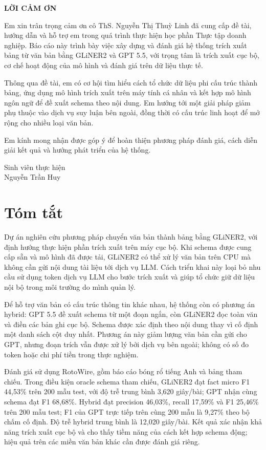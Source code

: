 \documentclass[12pt,a4paper]{article}
\begin{document}
\clearpage\thispagestyle{empty}
\begin{center}\Large\bfseries LỜI CẢM ƠN\end{center}
\vspace{.6cm}
Em xin trân trọng cảm ơn cô ThS. Nguyễn Thị Thuỳ Linh đã cung cấp đề tài, hướng dẫn và hỗ trợ em trong quá trình thực hiện học phần Thực tập doanh nghiệp. Báo cáo này trình bày việc xây dựng và đánh giá hệ thống trích xuất bảng từ văn bản bằng GLiNER2 và GPT 5.5, với trọng tâm là trích xuất cục bộ, cơ chế hoạt động của mô hình và đánh giá trên dữ liệu thực tế.

Thông qua đề tài, em có cơ hội tìm hiểu cách tổ chức dữ liệu phi cấu trúc thành bảng, ứng dụng mô hình trích xuất trên máy tính cá nhân và kết hợp mô hình ngôn ngữ để đề xuất schema theo nội dung. Em hướng tới một giải pháp giảm phụ thuộc vào dịch vụ suy luận bên ngoài, đồng thời có cấu trúc linh hoạt để mở rộng cho nhiều loại văn bản.

Em kính mong nhận được góp ý để hoàn thiện phương pháp đánh giá, cách diễn giải kết quả và hướng phát triển của hệ thống.
\begin{flushright}Sinh viên thực hiện\\Nguyễn Trần Huy\end{flushright}

\clearpage
{}
\section*{Tóm tắt}
Dự án nghiên cứu phương pháp chuyển văn bản thành bảng bằng GLiNER2, với định hướng thực hiện phần trích xuất trên máy cục bộ. Khi schema được cung cấp sẵn và mô hình đã được tải, GLiNER2 có thể xử lý văn bản trên CPU mà không cần gửi nội dung tài liệu tới dịch vụ LLM. Cách triển khai này loại bỏ nhu cầu sử dụng token dịch vụ LLM cho bước trích xuất và giúp tổ chức giữ dữ liệu nội bộ trong môi trường do mình quản lý.

Để hỗ trợ văn bản có cấu trúc thông tin khác nhau, hệ thống còn có phương án hybrid: GPT 5.5 đề xuất schema từ một đoạn ngắn, còn GLiNER2 đọc toàn văn và điền các bản ghi cục bộ. Schema được xác định theo nội dung thay vì cố định một danh sách cột duy nhất. Phương án này giảm lượng văn bản cần gửi cho GPT, nhưng đoạn trích vẫn được xử lý bởi dịch vụ bên ngoài; không có số đo token hoặc chi phí tiền trong thực nghiệm.

Đánh giá sử dụng RotoWire, gồm báo cáo bóng rổ tiếng Anh và bảng tham chiếu. Trong điều kiện oracle schema tham chiếu, GLiNER2 đạt fact micro F1 44,53\% trên 200 mẫu test, với độ trễ trung bình 3,620 giây/bài; GPT nhận cùng schema đạt F1 68,68\%. Hybrid đạt precision 46,03\%, recall 17,59\% và F1 25,46\% trên 200 mẫu test; F1 của GPT trực tiếp trên cùng 200 mẫu là 9,27\% theo bộ chấm cố định. Độ trễ hybrid trung bình là 12,020 giây/bài. Kết quả xác nhận khả năng trích xuất cục bộ và cho thấy tiềm năng của cách kết hợp schema động; hiệu quả trên các miền văn bản khác cần được đánh giá riêng.
\end{document}
